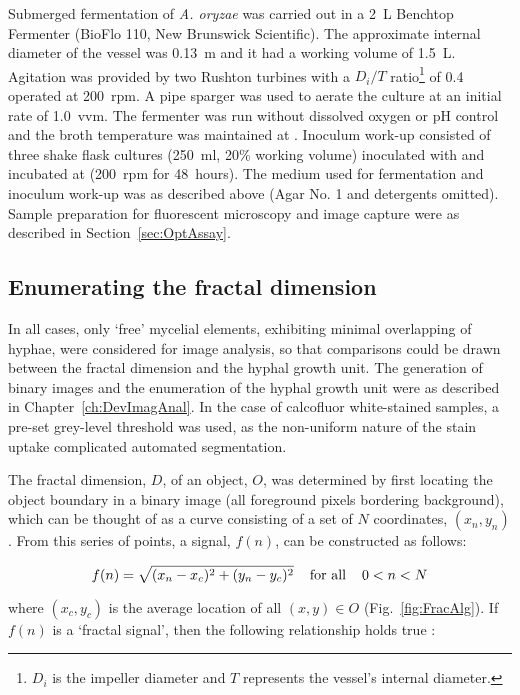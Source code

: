Submerged fermentation of \emph{A. oryzae} was carried out in a 2~L Benchtop Fermenter (BioFlo 110, New Brunswick Scientific). The approximate internal diameter of the vessel was 0.13~m and it had a working volume of 1.5~L. Agitation was provided by two Rushton turbines with a $D_i/T$ ratio\footnote{$D_i$ is the impeller diameter and $T$ represents the vessel's internal diameter.} of 0.4 operated at 200~rpm. A pipe sparger was used to aerate the culture at an initial rate of 1.0~vvm. The fermenter was run without dissolved oxygen or pH control and the broth temperature was maintained at . Inoculum work-up consisted of three shake flask cultures (250~ml, 20\% working volume) inoculated with  and incubated at  (200~rpm for 48~hours). The medium used for fermentation and inoculum work-up was as described above (Agar No. 1 and detergents omitted). Sample preparation for fluorescent microscopy and image capture were as described in Section~\ref{sec:OptAssay}.

\subsection{Enumerating the fractal dimension}

In all cases, only \lq free' mycelial elements, exhibiting minimal overlapping of hyphae, were considered for image analysis, so that comparisons could be drawn between the fractal dimension and the hyphal growth unit. The generation of binary images and the enumeration of the hyphal growth unit were as described in Chapter~\ref{ch:DevImagAnal}. In the case of calcofluor white-stained samples, a pre-set grey-level threshold was used, as the non-uniform nature of the stain uptake complicated automated segmentation.

The fractal dimension, $D$, of an object, $O$, was determined by first locating the object boundary in a binary image (all foreground pixels bordering background), which can be thought of as a curve consisting of a set of $N$ coordinates, $(x_n, y_n)$. From this series of points, a signal, $f(n)$, can be constructed as follows:

\begin{equation} \label{eq:f(n)xy}
	f(n) = \sqrt{(x_n - x_c)^2 + (y_n - y_c)^2} \hspace{0.4cm} \mbox{for all} \hspace{0.4cm} 0 < n < N
\end{equation}

\noindent where $(x_c, y_c)$ is the average location of all $(x, y) \in O$ (Fig.~\ref{fig:FracAlg}). If $f(n)$ is a \lq fractal signal', then the following relationship holds true \cite{blackledge2005}:

